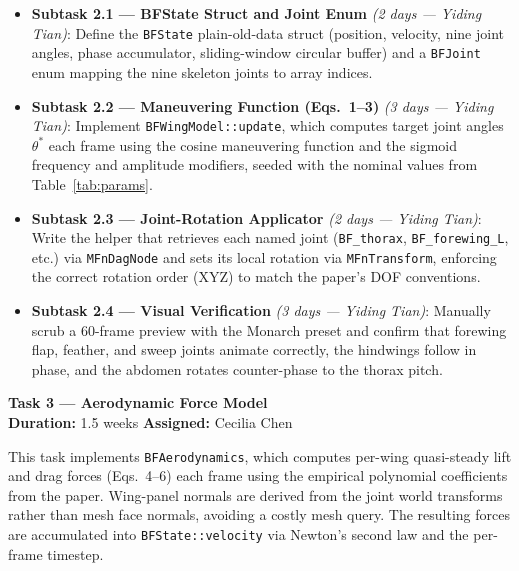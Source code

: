 \documentclass[12pt]{article}
\begin{document}
\begin{itemize}
  \item \textbf{Subtask 2.1 --- BFState Struct and Joint Enum} \textit{(2 days --- Yiding Tian)}: Define the
    \texttt{BFState} plain-old-data struct (position, velocity, nine joint angles,
    phase accumulator, sliding-window circular buffer) and a \texttt{BFJoint} enum
    mapping the nine skeleton joints to array indices.
  \item \textbf{Subtask 2.2 --- Maneuvering Function (Eqs.~1--3)} \textit{(3 days --- Yiding Tian)}: Implement
    \texttt{BFWingModel::update}, which computes target joint angles $\theta^*$ each
    frame using the cosine maneuvering function and the sigmoid frequency and
    amplitude modifiers, seeded with the nominal values from
    Table~\ref{tab:params}.
  \item \textbf{Subtask 2.3 --- Joint-Rotation Applicator} \textit{(2 days --- Yiding Tian)}: Write the helper that
    retrieves each named joint (\texttt{BF\_thorax}, \texttt{BF\_forewing\_L}, etc.)
    via \texttt{MFnDagNode} and sets its local rotation via \texttt{MFnTransform},
    enforcing the correct rotation order (XYZ) to match the paper's DOF conventions.
  \item \textbf{Subtask 2.4 --- Visual Verification} \textit{(3 days --- Yiding Tian)}: Manually scrub a 60-frame
    preview with the Monarch preset and confirm that forewing flap, feather, and
    sweep joints animate correctly, the hindwings follow in phase, and the abdomen
    rotates counter-phase to the thorax pitch.
\end{itemize}

\bigskip
\noindent\textbf{Task 3 --- Aerodynamic Force Model}\\
\textbf{Duration:} 1.5 weeks \quad \textbf{Assigned:} Cecilia Chen

This task implements \texttt{BFAerodynamics}, which computes per-wing quasi-steady
lift and drag forces (Eqs.~4--6) each frame using the empirical polynomial
coefficients from the paper. Wing-panel normals are derived from the joint world
transforms rather than mesh face normals, avoiding a costly mesh query. The
resulting forces are accumulated into \texttt{BFState::velocity} via Newton's second
law and the per-frame timestep.
\end{document}
